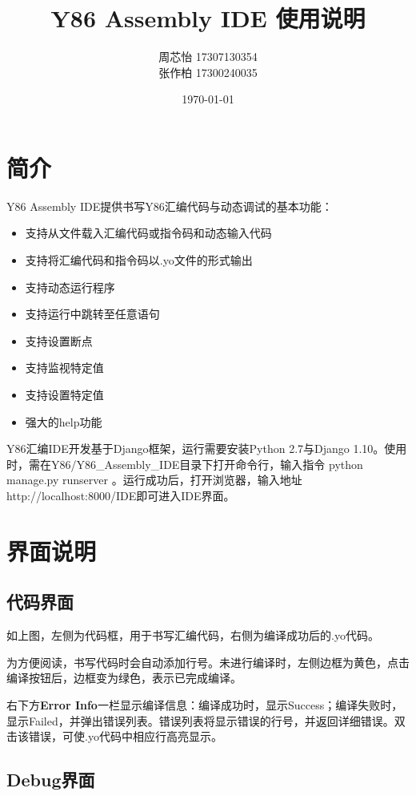 \documentclass[12pt]{article} %
\title{\textbf{Y86 Assembly IDE 使用说明}}
\author{周芯怡 17307130354\\张作柏 17300240035}
\date{\today}
\begin{document}
\begin{sloppypar}
\maketitle

\section{简介}

Y86 Assembly IDE提供书写Y86汇编代码与动态调试的基本功能：
\begin{itemize}
\item 支持从文件载入汇编代码或指令码和动态输入代码
\item 支持将汇编代码和指令码以.yo文件的形式输出
\item 支持动态运行程序
\item 支持运行中跳转至任意语句
\item 支持设置断点
\item 支持监视特定值
\item 支持设置特定值
\item 强大的help功能
\end{itemize}

Y86汇编IDE开发基于Django框架，运行需要安装Python 2.7与Django 1.10。使用时，需在Y86/Y86\_Assembly\_IDE目录下打开命令行，输入指令 python manage.py runserver 。运行成功后，打开浏览器，输入地址 http://localhost:8000/IDE即可进入IDE界面。

\clearpage
\section{界面说明}

\subsection{代码界面}

如上图，左侧为代码框，用于书写汇编代码，右侧为编译成功后的.yo代码。

为方便阅读，书写代码时会自动添加行号。未进行编译时，左侧边框为黄色，点击编译按钮后，边框变为绿色，表示已完成编译。

右下方{\bf Error Info}一栏显示编译信息：编译成功时，显示Success；编译失败时，显示Failed，并弹出错误列表。错误列表将显示错误的行号，并返回详细错误。双击该错误，可使.yo代码中相应行高亮显示。

\subsection{Debug界面}


\end{sloppypar}
\end{document}
